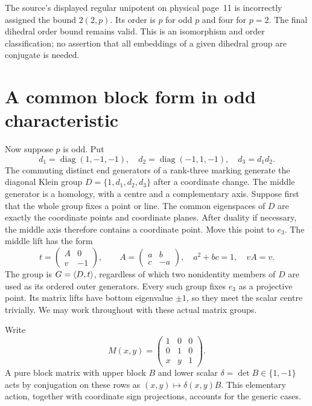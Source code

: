\documentclass[11pt]{article}
\begin{document}
The source's displayed regular unipotent on physical page~11 is
incorrectly assigned the bound $2(2,p)$. Its order is $p$ for odd $p$
and four for $p=2$. The final dihedral order bound remains valid.
This is an isomorphism and order classification; no assertion that all
embeddings of a given dihedral group are conjugate is needed.

\section*{A common block form in odd characteristic}
Now suppose $p$ is odd. Put
\[
 d_1=\operatorname{diag}(1,-1,-1),\quad
 d_2=\operatorname{diag}(-1,1,-1),\quad d_3=d_1d_2.
\]
The commuting distinct end generators of a rank-three marking generate
the diagonal Klein group $D=\{1,d_1,d_2,d_3\}$ after a coordinate
change. The middle generator is a homology, with a centre and a
complementary axis. Suppose first that the whole group fixes a point
or line. The common eigenspaces of $D$ are exactly the coordinate
points and coordinate planes. After duality if necessary, the middle
axis therefore contains a coordinate point. Move this point to $e_3$.
The middle lift has the form
\[
 t=\begin{pmatrix}A&0\\v&-1\end{pmatrix},\qquad
 A=\begin{pmatrix}a&b\\c&-a\end{pmatrix},\quad
 a^2+bc=1,\quad vA=v.                                 \tag{1}
\]
The group is $G=\langle D,t\rangle$, regardless of which two nonidentity
members of $D$ are used as its ordered outer generators.
Every such group fixes $e_3$ as a projective point. Its matrix lifts
have bottom eigenvalue $\pm1$, so they meet the scalar centre trivially.
We may work throughout with these actual matrix groups.

Write
\[
 M(x,y)=\begin{pmatrix}1&0&0\\0&1&0\\x&y&1\end{pmatrix}.
\]
A pure block matrix with upper block $B$ and lower scalar
$\delta=\det B\in\{1,-1\}$ acts by conjugation on these rows as
$(x,y)\mapsto\delta(x,y)B$. This elementary action, together with
coordinate sign projections, accounts for the generic cases.
\end{document}
